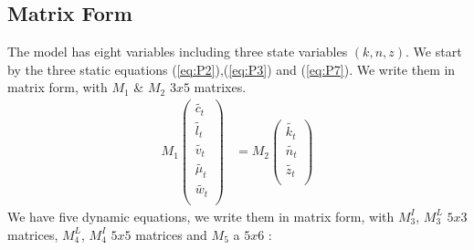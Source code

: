 \documentclass[english]{article}
\begin{document}
\subsection{Matrix Form}
The model has eight variables including three state variables $(k,n,z)$. 
We start by the three static equations (\ref{eq:P2}),(\ref{eq:P3}) and (\ref{eq:P7}). We write them in matrix form, with $M_1$ \& $M_2$ $3x5$ matrixes.
\begin{align}
M_1
\begin{pmatrix}
  \widetilde{c_t} \\
  \widetilde{l_t} \\
  \widetilde{v_t} \\
  \widetilde{\mu_t} \\
  \widetilde{w_t} \\
\end{pmatrix}
&= M_2
\begin{pmatrix}
  \widetilde{k_t}\\
  \widetilde{n_t}\\
  \widetilde{z_t}\\
\end{pmatrix}
\end{align}
We have five dynamic equations, we write them in matrix form, with $M_3^{I}$, $M_3^{L}$ $5x3$ matrices, $M_{4}^{L}$, $M_{4}^{I}$ $5x5$ matrices and $M_{5}$ a $5x6$ :
\end{document}
